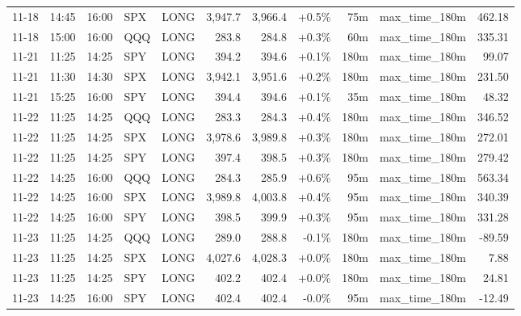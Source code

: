 \documentclass[11pt,a4paper,twoside]{article}
\begin{document}
\begin{center}
\begin{longtable}{>{\color{txtmain}}l l l l l r r r r >{\color{txtmain}}l r}
11-18 & 14:45 & 16:00 & SPX & LONG & 3,947.7 & 3,966.4 & \textcolor{wingreen}{+0.5\%} & 75m & max\_time\_180m & \textcolor{wingreen}{462.18} \\
11-18 & 15:00 & 16:00 & QQQ & LONG & 283.8 & 284.8 & \textcolor{wingreen}{+0.3\%} & 60m & max\_time\_180m & \textcolor{wingreen}{335.31} \\
11-21 & 11:25 & 14:25 & SPY & LONG & 394.2 & 394.6 & \textcolor{wingreen}{+0.1\%} & 180m & max\_time\_180m & \textcolor{wingreen}{99.07} \\
11-21 & 11:30 & 14:30 & SPX & LONG & 3,942.1 & 3,951.6 & \textcolor{wingreen}{+0.2\%} & 180m & max\_time\_180m & \textcolor{wingreen}{231.50} \\
11-21 & 15:25 & 16:00 & SPY & LONG & 394.4 & 394.6 & \textcolor{wingreen}{+0.1\%} & 35m & max\_time\_180m & \textcolor{wingreen}{48.32} \\
11-22 & 11:25 & 14:25 & QQQ & LONG & 283.3 & 284.3 & \textcolor{wingreen}{+0.4\%} & 180m & max\_time\_180m & \textcolor{wingreen}{346.52} \\
11-22 & 11:25 & 14:25 & SPX & LONG & 3,978.6 & 3,989.8 & \textcolor{wingreen}{+0.3\%} & 180m & max\_time\_180m & \textcolor{wingreen}{272.01} \\
11-22 & 11:25 & 14:25 & SPY & LONG & 397.4 & 398.5 & \textcolor{wingreen}{+0.3\%} & 180m & max\_time\_180m & \textcolor{wingreen}{279.42} \\
11-22 & 14:25 & 16:00 & QQQ & LONG & 284.3 & 285.9 & \textcolor{wingreen}{+0.6\%} & 95m & max\_time\_180m & \textcolor{wingreen}{563.34} \\
11-22 & 14:25 & 16:00 & SPX & LONG & 3,989.8 & 4,003.8 & \textcolor{wingreen}{+0.4\%} & 95m & max\_time\_180m & \textcolor{wingreen}{340.39} \\
11-22 & 14:25 & 16:00 & SPY & LONG & 398.5 & 399.9 & \textcolor{wingreen}{+0.3\%} & 95m & max\_time\_180m & \textcolor{wingreen}{331.28} \\
11-23 & 11:25 & 14:25 & QQQ & LONG & 289.0 & 288.8 & \textcolor{lossred}{-0.1\%} & 180m & max\_time\_180m & \textcolor{lossred}{-89.59} \\
11-23 & 11:25 & 14:25 & SPX & LONG & 4,027.6 & 4,028.3 & \textcolor{wingreen}{+0.0\%} & 180m & max\_time\_180m & \textcolor{wingreen}{7.88} \\
11-23 & 11:25 & 14:25 & SPY & LONG & 402.2 & 402.4 & \textcolor{wingreen}{+0.0\%} & 180m & max\_time\_180m & \textcolor{wingreen}{24.81} \\
11-23 & 14:25 & 16:00 & SPY & LONG & 402.4 & 402.4 & \textcolor{lossred}{-0.0\%} & 95m & max\_time\_180m & \textcolor{lossred}{-12.49} \\

\end{longtable}
\end{center}
\end{document}
